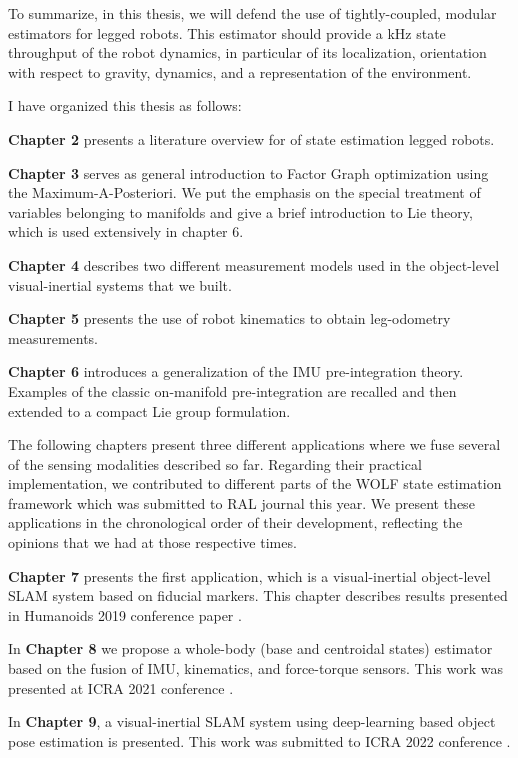 To summarize, in this thesis, we will defend the use of tightly-coupled, modular estimators for legged robots. This estimator should provide a kHz state 
throughput of the robot dynamics, in particular of its localization, orientation with respect to gravity, dynamics, and a representation of the environment.

I have organized this thesis as follows:

\bigskip
\textbf{Chapter 2} presents a literature overview for of state estimation legged robots. 

\bigskip
\textbf{Chapter 3} serves as general introduction to Factor Graph optimization using the Maximum-A-Posteriori. We put the emphasis
on the special treatment of variables belonging to manifolds and give a brief introduction to Lie theory, which is used extensively in chapter 6.

\bigskip
\textbf{Chapter 4} describes two different measurement models used in the object-level visual-inertial systems that we built. 

\bigskip
\textbf{Chapter 5} presents the use of robot kinematics to obtain leg-odometry measurements. 

\bigskip
\textbf{Chapter 6} introduces a generalization of the IMU pre-integration theory. Examples of the classic on-manifold pre-integration are recalled and 
then extended to a compact Lie group formulation. 

\bigskip
The following chapters present three different applications where we fuse several of the sensing modalities described so far.
Regarding their practical implementation, we contributed to different parts of the WOLF state estimation framework \cite{sola2021wolf} which was 
submitted to RAL journal this year. We present these applications in the chronological order of their development, reflecting the opinions that
we had at those respective times.

\bigskip
\textbf{Chapter 7} presents the first application, which is a visual-inertial object-level SLAM system based on fiducial markers. This chapter describes
results presented in Humanoids 2019 conference paper \cite{fourmy2019absolute}.

\bigskip
In \textbf{Chapter 8} we propose a whole-body (base and centroidal states) estimator based on the fusion of IMU, kinematics, and force-torque sensors. This
work was presented at ICRA 2021 conference \cite{fourmy2021contact}.

\bigskip
In \textbf{Chapter 9}, a visual-inertial SLAM system using deep-learning based object pose estimation is presented. This work was submitted to ICRA 2022 conference 
\cite{debeunne2021cosyslam}.





